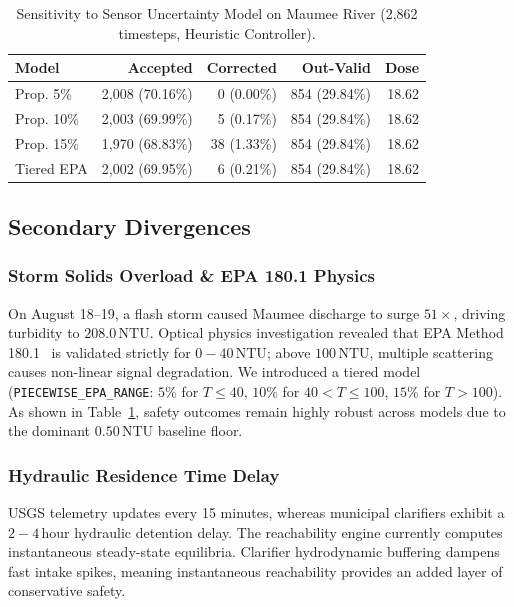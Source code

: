 \documentclass[10pt,twocolumn,letterpaper]{article}
\theoremstyle{definition}
\begin{document}
\begin{table}[t]
\centering
\small
\caption{Sensitivity to Sensor Uncertainty Model on Maumee River (2,862 timesteps, Heuristic Controller).}
\label{tab:sensor_models}
\begin{tabular}{lrrrr}
\toprule
\textbf{Model} & \textbf{Accepted} & \textbf{Corrected} & \textbf{Out-Valid} & \textbf{Dose} \\
\midrule
Prop. 5\% & 2,008 (70.16\%) & 0 (0.00\%) & 854 (29.84\%) & 18.62 \\
Prop. 10\% & 2,003 (69.99\%) & 5 (0.17\%) & 854 (29.84\%) & 18.62 \\
Prop. 15\% & 1,970 (68.83\%) & 38 (1.33\%) & 854 (29.84\%) & 18.62 \\
Tiered EPA & 2,002 (69.95\%) & 6 (0.21\%) & 854 (29.84\%) & 18.62 \\
\bottomrule
\end{tabular}
\end{table}

\subsection{Secondary Divergences}
\subsubsection{Storm Solids Overload \& EPA 180.1 Physics}
On August 18--19, a flash storm caused Maumee discharge to surge $51\times$, driving turbidity to $208.0\,\text{NTU}$. Optical physics investigation revealed that EPA Method 180.1~\cite{epa1993method180} is validated strictly for $0 - 40\,\text{NTU}$; above $100\,\text{NTU}$, multiple scattering causes non-linear signal degradation. We introduced a tiered model (\texttt{PIECEWISE\_EPA\_RANGE}: $5\%$ for $T \le 40$, $10\%$ for $40 < T \le 100$, $15\%$ for $T > 100$). As shown in Table~\ref{tab:sensor_models}, safety outcomes remain highly robust across models due to the dominant $0.50\,\text{NTU}$ baseline floor.

\subsubsection{Hydraulic Residence Time Delay}
USGS telemetry updates every 15 minutes, whereas municipal clarifiers exhibit a $2 - 4\,\text{hour}$ hydraulic detention delay. The reachability engine currently computes instantaneous steady-state equilibria. Clarifier hydrodynamic buffering dampens fast intake spikes, meaning instantaneous reachability provides an added layer of conservative safety.
\end{document}
